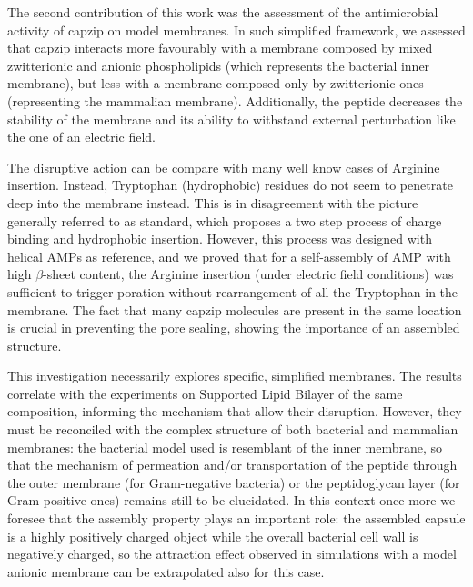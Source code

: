 The second contribution of this work was the assessment of the antimicrobial activity of capzip on model membranes. In such simplified framework, we assessed that capzip interacts more favourably with a membrane composed by mixed zwitterionic and anionic phospholipids (which represents the bacterial inner membrane), but less with a membrane composed only by zwitterionic ones (representing the mammalian membrane). Additionally, the peptide decreases the stability of the membrane and its ability to withstand external perturbation like the one of an electric field.

The disruptive action can be compare with many well know cases of Arginine insertion.  Instead, Tryptophan (hydrophobic) residues do not seem to penetrate deep into the membrane instead.
%
This is in disagreement with the picture generally referred to as standard, which proposes a two step process of charge binding and hydrophobic insertion. However, this process was designed with helical AMPs as reference, and we proved that for a self-assembly of AMP with high $\beta$-sheet content, the Arginine insertion (under electric field conditions) was sufficient to trigger poration without rearrangement of all the Tryptophan in the membrane. The fact that many capzip molecules are present in the same location is crucial in preventing the pore sealing, showing the importance of an assembled structure.

This investigation necessarily explores specific, simplified membranes. The results correlate with the experiments on Supported Lipid Bilayer of the same composition, informing the mechanism that allow their disruption. However, they must be reconciled with the complex structure of both bacterial and mammalian membranes: the bacterial model used is resemblant of the inner membrane, so that the mechanism of permeation and/or transportation of the peptide through the outer membrane (for Gram-negative bacteria) or the peptidoglycan layer (for Gram-positive ones) remains still to be elucidated.
%
In this context once more we foresee that the assembly property plays an important role: the assembled capsule is a highly positively charged object while the overall bacterial cell wall is negatively charged, so the attraction effect observed in simulations with a model anionic membrane can be extrapolated also for this case. 

